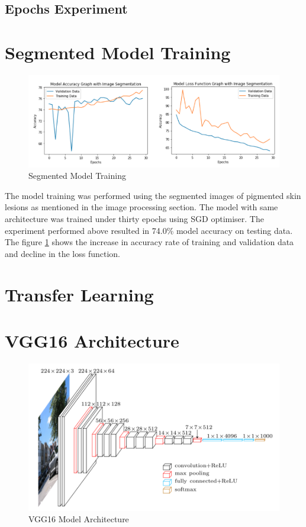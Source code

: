 \subsection{Epochs Experiment}


\section{Segmented Model Training}
\begin{figure}[!htp]
    \centering
    \includegraphics[width=\textwidth]{Images/segmented.png}
    \caption{Segmented Model Training}
    \label{fig:segmodel}
\end{figure}
The model training was performed using the segmented images of pigmented skin lesions as mentioned in the 
image processing section. The model with same architecture was trained under thirty epochs using SGD optimiser. The experiment performed above resulted in 74.0\% model 
accuracy on testing data. The figure \ref{fig:segmodel} shows the increase in accuracy rate of training and 
validation data and decline in the loss function.

\pagebreak
\section{Transfer Learning}

\pagebreak
\section{VGG16 Architecture}
\begin{figure}[!htp]
    \centering
    \includegraphics[width=\textwidth]{Images/vgg16.png}
    \caption{VGG16 Model Architecture}
\end{figure}

